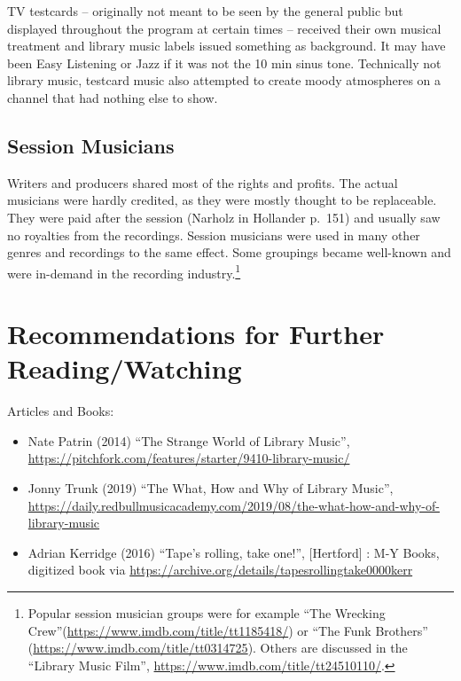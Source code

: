 \documentclass[a4paper,
fontsize=11pt,
oneside,
numbers=noperiodatend,
parskip=half-,
bibliography=totoc,
final
]{scrartcl}
\begin{document}
TV testcards -- originally not meant to be seen by the general public
but displayed throughout the program at certain times -- received their
own musical treatment and library music labels issued something as
background. It may have been Easy Listening or Jazz if it was not the 10
min sinus tone. Technically not library music, testcard music also
attempted to create moody atmospheres on a channel that had nothing else
to show.

\hypertarget{session-musicians}{%
\subsection{Session Musicians}\label{session-musicians}}

Writers and producers shared most of the rights and profits. The actual
musicians were hardly credited, as they were mostly thought to be
replaceable. They were paid after the session (Narholz in Hollander
p.~151) and usually saw no royalties from the recordings. Session
musicians were used in many other genres and recordings to the same
effect. Some groupings became well-known and were in-demand in the
recording industry.\footnote{Popular session musician groups were for example \enquote{The Wrecking Crew}(\url{https://www.imdb.com/title/tt1185418/}) or \enquote{The Funk Brothers} (\url{https://www.imdb.com/title/tt0314725}). Others are discussed in the \enquote{Library Music Film}, \url{https://www.imdb.com/title/tt24510110/}.}

\hypertarget{recommendations-for-further-readingwatching}{%
\section{Recommendations for Further
Reading/Watching}\label{recommendations-for-further-readingwatching}}

Articles and Books:

\begin{itemize}
\item
  Nate Patrin (2014) \enquote{The Strange World of Library Music},
  \url{https://pitchfork.com/features/starter/9410-library-music/}
\item
  Jonny Trunk (2019) \enquote{The What, How and Why of Library Music},
  \url{https://daily.redbullmusicacademy.com/2019/08/the-what-how-and-why-of-library-music}
\item
  Adrian Kerridge (2016) \enquote{Tape's rolling, take one!},
  {[}Hertford{]} : M-Y Books, digitized book via
  \url{https://archive.org/details/tapesrollingtake0000kerr}
\end{itemize}
\end{document}

